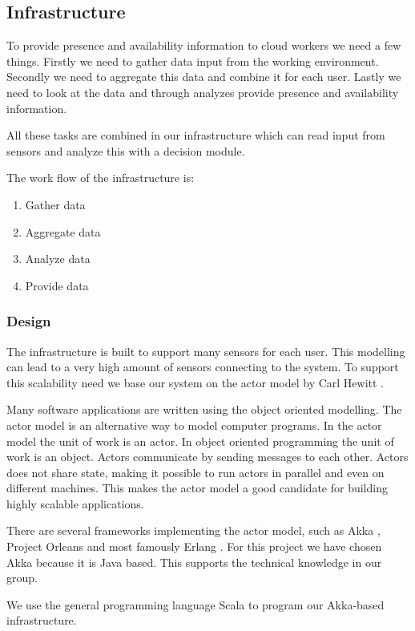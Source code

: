 \documentclass{sigchi}
\begin{document}
\subsection{Infrastructure}
To provide presence and availability information to cloud workers we need a few things.
Firstly we need to gather data input from the working environment.
Secondly we need to aggregate this data and combine it for each user.
Lastly we need to look at the data and through analyzes provide presence and availability information.

All these tasks are combined in our infrastructure which can read input from sensors and analyze this with a decision module.

The work flow of the infrastructure is:
\begin{enumerate}
  \item Gather data
  \item Aggregate data
  \item Analyze data
  \item Provide data
\end{enumerate}

\subsubsection{Design}
The infrastructure is built to support many sensors for each user.
This modelling can lead to a very high amount of sensors connecting to the system.
To support this scalability need we base our system on the actor model by Carl Hewitt \cite{hewitt1973universal}.

Many software applications are written using the object oriented modelling.
The actor model is an alternative way to model computer programs.
In the actor model the unit of work is an actor.
In object oriented programming the unit of work is an object.
Actors communicate by sending messages to each other.
Actors does not share state, making it possible to run actors in parallel and even on different machines.
This makes the actor model a good candidate for building highly scalable applications.

There are several frameworks implementing the actor model, such as Akka \cite{akka}, Project Orleans \cite{orleans} and most famously Erlang \cite{erlang}.
For this project we have chosen Akka because it is Java based.
This supports the technical knowledge in our group.

We use the general programming language Scala \cite{scala} to program our Akka-based infrastructure.
\end{document}
